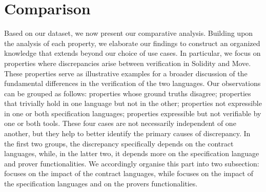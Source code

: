 \section{Comparison}
\label{sec:comparison}



Based on our dataset, we now present our comparative analysis.
Building upon the analysis of each property, we elaborate our findings to construct an organized knowledge that extends beyond our choice of use cases. 
In particular, we focus on properties where discrepancies arise between verification in Solidity and Move.
These properties serve as illustrative examples for a broader discussion of the fundamental differences in the verification of the two languages.
%
Our observations can be grouped as follows: 
properties whose ground truths disagree;  
properties that trivially hold in one language but not in the other; 
properties not expressible in one or both specification languages; 
properties expressible but not verifiable by one or both tools.
%
These four cases are not necessarily independent of one another, but they help to better identify the primary causes of discrepancy. %
In the first two groups, the discrepancy specifically depends on the contract languages, while, in the latter two, it depends more on the specification language and prover functionalities. %
We accordingly organise this part into two subsection:  focuses on the impact of the contract languages, while  focuses on the impact of the specification languages and on the provers functionalities.


